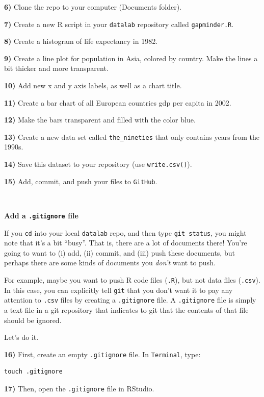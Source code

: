 \documentclass[
]{book}
\begin{document}
\textbf{6)} Clone the repo to your computer (Documents folder).

\textbf{7)} Create a new R script in your \texttt{datalab} repository called \texttt{gapminder.R}.

\textbf{8)} Create a histogram of life expectancy in 1982.

\textbf{9)} Create a line plot for population in Asia, colored by country. Make the lines a bit thicker and more transparent.

\textbf{10)} Add new x and y axis labels, as well as a chart title.

\textbf{11)} Create a bar chart of all European countries gdp per capita in 2002.

\textbf{12)} Make the bars transparent and filled with the color blue.

\textbf{13)} Create a new data set called \texttt{the\_nineties} that only contains years from the 1990s.

\textbf{14)} Save this dataset to your repository (use \texttt{write.csv()}).

\textbf{15)} Add, commit, and push your files to \texttt{GitHub}.

~

\textbf{Add a \texttt{.gitignore} file}

If you \texttt{cd} into your local \texttt{datalab} repo, and then type \texttt{git\ status}, you might note that it's a bit ``busy''. That is, there are a lot of documents there! You're going to want to (i) add, (ii) commit, and (iii) push these documents, but perhaps there are some kinds of documents you \emph{don't} want to push.

For example, maybe you want to push R code files (\texttt{.R}), but not data files (\texttt{.csv}). In this case, you can explicitly tell \texttt{git} that you don't want it to pay any attention to \texttt{.csv} files by creating a \texttt{.gitignore} file. A \texttt{.gitignore} file is simply a text file in a git repository that indicates to git that the contents of that file should be ignored.

Let's do it.

\textbf{16)} First, create an empty \texttt{.gitignore} file. In \texttt{Terminal}, type:

\begin{verbatim}
touch .gitignore
\end{verbatim}

\textbf{17)} Then, open the \texttt{.gitignore} file in RStudio.
\end{document}
